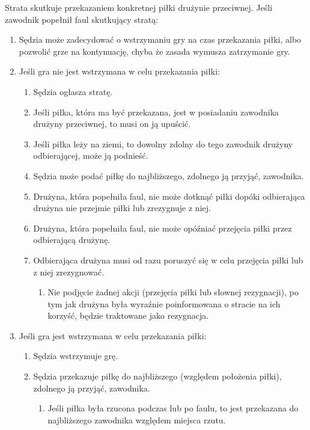 \documentclass[11pt,a4paper]{article}
\renewcommand{\subsubsection}[1]{
  \oldsubsubsection{#1}%
  \label{\thesubsubsection}
}
\begin{document}
\subsubsection{Strata}
Strata skutkuje przekazaniem konkretnej piłki drużynie przeciwnej. Jeśli zawodnik popełnił faul skutkujący stratą:
\begin{enumerate}
  \item Sędzia może zadecydować o wstrzymaniu gry na czas przekazania piłki, albo pozwolić grze na kontynuację, chyba że zasada wymusza zatrzymanie gry.
  \item Jeśli gra nie jest wstrzymana w celu przekazania piłki:
  \begin{enumerate}
    \item Sędzia ogłasza stratę.
    \item Jeśli piłka, która ma być przekazana, jest w posiadaniu zawodnika drużyny przeciwnej, to musi on ją upuścić.
    \item Jeśli piłka leży na ziemi, to dowolny zdolny do tego zawodnik drużyny odbierającej, może ją podnieść.
    \item Sędzia może podać piłkę do najbliższego, zdolnego ją przyjąć, zawodnika.
    \item Drużyna, która popełniła faul, nie może dotknąć piłki dopóki odbierająca drużyna nie przejmie piłki lub zrezygnuje z niej.
    \item Drużyna, która popełniła faul, nie może opóźniać przejęcia piłki przez odbierającą drużynę.
    \item Odbierająca drużyna musi od razu poruszyć się w celu przejęcia piłki lub z niej zrezygnować.
    \begin{enumerate}
      \item Nie podjęcie żadnej akcji (przejęcia piłki lub słownej rezygnacji), po tym jak drużyna była wyraźnie poinformowana o stracie na ich korzyść, będzie traktowane jako rezygnacja. 
    \end{enumerate}
  \end{enumerate}
  \item Jeśli gra jest wstrzymana w celu przekazania piłki:
  \begin{enumerate}
    \item Sędzia wstrzymuje grę.
    \item Sędzia przekazuje piłkę do najbliższego (względem położenia piłki), zdolnego ją przyjąć, zawodnika.
    \begin{enumerate}
      \item Jeśli piłka była rzucona podczas lub po faulu, to jest przekazana do najbliższego zawodnika względem miejsca rzutu.

\end{enumerate}
\end{enumerate}
\end{enumerate}
\end{document}

